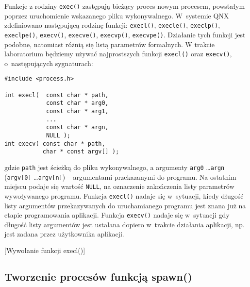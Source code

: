 Funkcje z rodziny \texttt{exec()} zastępują bieżący proces nowym procesem,
powstałym poprzez uruchomienie wskazanego pliku wykonywalnego. W~systemie QNX
zdefiniowano następującą rodzinę funkcji: \texttt{execl()}, \texttt{execle()},
\texttt{execlp()}, \texttt{execlpe()}, \texttt{execv()}, \texttt{execve()},
\texttt{execvp()}, \texttt{execvpe()}. Działanie tych funkcji jest podobne,
natomiast różnią się listą parametrów formalnych. W trakcie laboratorium
będziemy używać najprostszych funkcji \texttt{execl()} oraz \texttt{execv()},
o~następujących sygnaturach:
\begin{lstlisting}[style=MyCStyle]
#include <process.h>

int execl(  const char * path,
            const char * arg0,
            const char * arg1,
            ...
            const char * argn,
            NULL );
int execv( const char * path,
           char * const argv[] );
\end{lstlisting}
gdzie \texttt{path} jest ścieżką do pliku wykonywalnego, a argumenty
\texttt{arg0} \dots \texttt{argn} (\texttt{argv[0]} \dots \texttt{argv[n]}) --
argumentami przekazanymi do programu. Na ostatnim miejscu podaje się wartość
\texttt{NULL}, na oznaczenie zakończenia listy parametrów wywoływanego
programu. Funkcja \texttt{execl()} nadaje się w~sytuacji, kiedy długość listy
argumentów przekazywanych do uruchamianego programu jest znana już na etapie
programowania aplikacji. Funkcja \texttt{execv()} nadaje się w~sytuacji gdy
długość listy argumentów jest ustalana dopiero w~trakcie działania aplikacji,
np. jest zadana przez użytkownika aplikacji.
\begin{example}{[Wywołanie funkcji execl()]}
  \label{ex:WHF3V}
  
\end{example}

\subsection{Tworzenie procesów funkcją spawn()}

